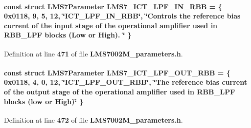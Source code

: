 \paragraph[{L\+M\+S7\+\_\+\+I\+C\+T\+\_\+\+L\+P\+F\+\_\+\+I\+N\+\_\+\+R\+BB}]{\setlength{\rightskip}{0pt plus 5cm}const struct {\bf L\+M\+S7\+Parameter} L\+M\+S7\+\_\+\+I\+C\+T\+\_\+\+L\+P\+F\+\_\+\+I\+N\+\_\+\+R\+BB = \{ 0x0118, 9, 5, 12, \char`\"{}\+I\+C\+T\+\_\+\+L\+P\+F\+\_\+\+I\+N\+\_\+\+R\+B\+B\char`\"{}, \char`\"{}\+Controls the reference bias current of the input stage of the operational amplifier used in R\+B\+B\+\_\+\+L\+P\+F blocks (\+Low or High). \char`\"{} \}\hspace{0.3cm}{\ttfamily [static]}}\label{LMS7002M__parameters_8h_ab52ba6e6dd2710264ab47887c56f60d3}


Definition at line {\bf 471} of file {\bf L\+M\+S7002\+M\+\_\+parameters.\+h}.

\paragraph[{L\+M\+S7\+\_\+\+I\+C\+T\+\_\+\+L\+P\+F\+\_\+\+O\+U\+T\+\_\+\+R\+BB}]{\setlength{\rightskip}{0pt plus 5cm}const struct {\bf L\+M\+S7\+Parameter} L\+M\+S7\+\_\+\+I\+C\+T\+\_\+\+L\+P\+F\+\_\+\+O\+U\+T\+\_\+\+R\+BB = \{ 0x0118, 4, 0, 12, \char`\"{}\+I\+C\+T\+\_\+\+L\+P\+F\+\_\+\+O\+U\+T\+\_\+\+R\+B\+B\char`\"{}, \char`\"{}\+The reference bias current of the output stage of the operational amplifier used in R\+B\+B\+\_\+\+L\+P\+F blocks (low or High)\char`\"{} \}\hspace{0.3cm}{\ttfamily [static]}}\label{LMS7002M__parameters_8h_aa4cc04c6945c37618685003cf9139d65}


Definition at line {\bf 472} of file {\bf L\+M\+S7002\+M\+\_\+parameters.\+h}.

